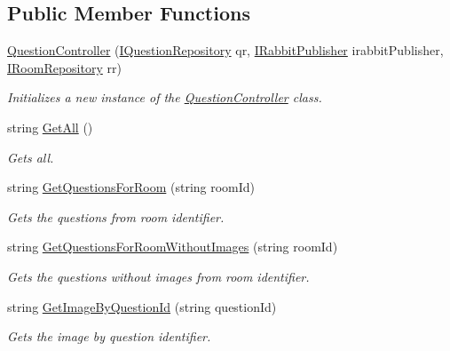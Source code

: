 \subsection*{Public Member Functions}
\begin{DoxyCompactItemize}
\item 
\hyperlink{class_wis_r_rest_a_p_i_1_1_controllers_1_1_question_controller_ad0ccb16874196a628858ef0ad7776744}{Question\+Controller} (\hyperlink{interface_wis_r_rest_a_p_i_1_1_domain_model_1_1_i_question_repository}{I\+Question\+Repository} qr, \hyperlink{interface_wis_r_rest_a_p_i_1_1_providers_1_1_i_rabbit_publisher}{I\+Rabbit\+Publisher} irabbit\+Publisher, \hyperlink{interface_wis_r_rest_a_p_i_1_1_domain_model_1_1_i_room_repository}{I\+Room\+Repository} rr)
\begin{DoxyCompactList}\small\item\em Initializes a new instance of the \hyperlink{class_wis_r_rest_a_p_i_1_1_controllers_1_1_question_controller}{Question\+Controller} class. \end{DoxyCompactList}\item 
string \hyperlink{class_wis_r_rest_a_p_i_1_1_controllers_1_1_question_controller_a87513af13495ffd09f937fcbaa335e78}{Get\+All} ()
\begin{DoxyCompactList}\small\item\em Gets all. \end{DoxyCompactList}\item 
string \hyperlink{class_wis_r_rest_a_p_i_1_1_controllers_1_1_question_controller_aa65a886c1945b384fdd5c771f3ba955e}{Get\+Questions\+For\+Room} (string room\+Id)
\begin{DoxyCompactList}\small\item\em Gets the questions from room identifier. \end{DoxyCompactList}\item 
string \hyperlink{class_wis_r_rest_a_p_i_1_1_controllers_1_1_question_controller_a5c4f6d6873b051a178ad11c4d000f677}{Get\+Questions\+For\+Room\+Without\+Images} (string room\+Id)
\begin{DoxyCompactList}\small\item\em Gets the questions without images from room identifier. \end{DoxyCompactList}\item 
string \hyperlink{class_wis_r_rest_a_p_i_1_1_controllers_1_1_question_controller_ac0725a562f4f3e7e61cc4b6f07ab9da1}{Get\+Image\+By\+Question\+Id} (string question\+Id)
\begin{DoxyCompactList}\small\item\em Gets the image by question identifier. \end{DoxyCompactList}\item 

\end{DoxyCompactItemize}
